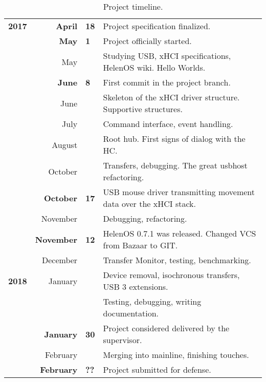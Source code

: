 \begin{table}[h]
	\centering
	{\renewcommand{\arraystretch}{1.2}
	\newcommand{\hl}{\rowcolor[gray]{0.95}}
	\begin{tabular*}{0.95\textwidth}{rr@{\hspace{\tabcolsep}}l|l}
	\hline \hl \textbf{2017}
	    & \textbf{April}    & \textbf{18} & Project specification finalized. \\
	\hl & \textbf{May}      & \textbf{1}  & Project officially started. \\
	    & May               &             & Studying USB, xHCI specifications, HelenOS wiki. Hello Worlds.\\
	\hl & \textbf{June}     & \textbf{8}  & First commit in the project branch. \\
	    & June              &             & Skeleton of the xHCI driver structure. Supportive structures. \\
	    & July              &             & Command interface, event handling. \\
	    & August            &             & Root hub. First signs of dialog with the HC. \\
	    & October           &             & Transfers, debugging. The great usbhost refactoring. \\
	\hl & \textbf{October}  & \textbf{17} & USB mouse driver transmitting movement data over the xHCI stack. \\
	    & November          &             & Debugging, refactoring.  \\
	\hl & \textbf{November} & \textbf{12} & HelenOS 0.7.1 was released. Changed VCS from Bazaar to GIT. \\
	    & December          &             & Transfer Monitor, testing, benchmarking. \\
	\hline \textbf{2018}
	    & January           &             & Device removal, isochronous transfers, USB 3 extensions. \\
	    &                   &             & Testing, debugging, writing documentation. \\
	\hl & \textbf{January}  & \textbf{30} & Project considered delivered by the supervisor. \\
	    & February          &             & Merging into mainline, finishing touches. \\
	\hl & \textbf{February} & \textbf{??} & Project submitted for defense. \\
	\hline
	\end{tabular*}
	}
	\caption{Project timeline.}
	\label{tbl:timeline}
\end{table}

